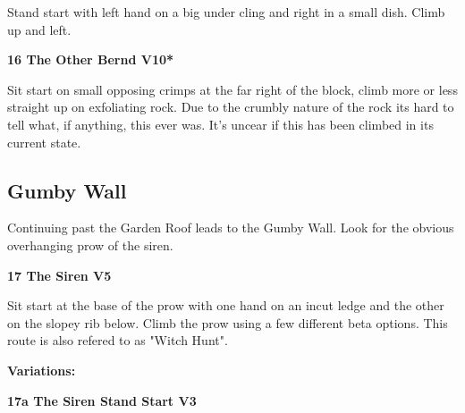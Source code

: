 \begin{multicols}{2}
\begin{minipage}{\linewidth}
					\begin{adjustwidth}{0.5cm}{}				
					Stand start with left hand on a big under cling and right in a small dish. Climb up and left.
					\end{adjustwidth}
					\end{minipage}
					\begin{minipage}{\linewidth}	
					\label{rt:The Other Bernd}
\colorbox{red!20}{
\parbox{0.95\textwidth}{
\textbf{
16 The Other Bernd V10*  
}
}
}

					\begin{adjustwidth}{0.5cm}{}				
					Sit start on small opposing crimps at the far right of the block, climb more or less straight up on exfoliating rock. Due to the crumbly nature of the rock its hard to tell what, if anything, this ever was. It's uncear if this has been climbed in its current state.
					\end{adjustwidth}
					\end{minipage}
			\begin{minipage}{\columnwidth}
			\subsection*{Gumby Wall}\label{bf:Gumby Wall}
			Continuing past the Garden Roof leads to the Gumby Wall. Look for the obvious overhanging prow of the siren.
			
			\end{minipage}
			

					\begin{minipage}{\linewidth}	
					\label{rt:The Siren}
\colorbox{RoyalBlue!20}{
\parbox{0.95\textwidth}{
\textbf{
17 The Siren V5     
}
}
}

					\begin{adjustwidth}{0.5cm}{}				
					Sit start at the base of the prow with one hand on an incut ledge and the other on the slopey rib below. Climb the prow using a few different beta options. This route is also refered to as "Witch Hunt".
					\end{adjustwidth}
					\end{minipage}
						\begin{adjustwidth}{0.5cm}{}				
						\textbf{Variations:} \newline
							\begin{minipage}{\linewidth}	
							\label{vr:The Siren Stand Start}
\colorbox{green!20}{
\parbox{0.95\textwidth}{
\textbf{
17a The Siren Stand Start V3    
}
}
}


\end{minipage}
\end{adjustwidth}
\end{multicols}
